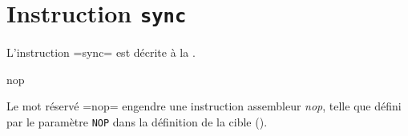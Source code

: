 












\section{Instruction \texttt{sync}}

L'instruction \plm=sync= est décrite à la .






\begin{PLM}
nop
\end{PLM}

Le mot réservé \plm=nop= engendre une instruction assembleur \emph{nop}, telle que défini par le paramètre \texttt{NOP} dans la définition de la cible ().

